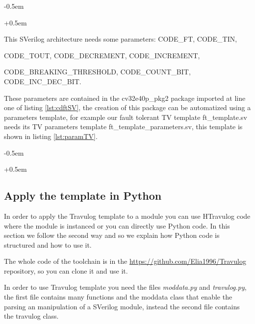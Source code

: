 {{{    		\openup -0.5em
    	
        	
        	
    		\openup +0.5em
    		
    		This SVerilog architecture needs some parameters: CODE\_FT, CODE\_TIN,
    		
    		CODE\_TOUT,  CODE\_DECREMENT,  CODE\_INCREMENT,     
    		
    		CODE\_BREAKING\_THRESHOLD,     
    		CODE\_COUNT\_BIT, CODE\_INC\_DEC\_BIT. 
    		
    		These parameters are contained in the cv32e40p\_pkg2 package imported at line one of listing \ref{lst:cdftSV}, the creation of this package can be automatized using a parameters template, for example our fault tolerant TV template ft\_template.sv needs its TV parameters template ft\_template\_parameters.sv, this template is shown in listing \ref{lst:paramTV}.
    		
    		
    		\openup -0.5em
    	
        	
        	
    		\openup +0.5em
    		
    		
    		
    	}%
    	
    	\subsection{Apply the template in Python}{
            In order to apply the Travulog template to a module you can use HTravulog code where the module is instanced or you can directly use Python code. In this section we follow the second way and so we explain how Python code is structured and how to use it.
            
            The whole code of the toolchain is in the \url{https://github.com/Elia1996/Travulog} repository, so you can clone it and use it. 
            
            In order to use Travulog template you need the files \textit{moddata.py} and \textit{travulog.py}, the first file contains many functions and the moddata class that enable the parsing an manipulation of a SVerilog module, instead the second file contains the travulog class.
            
}}}
